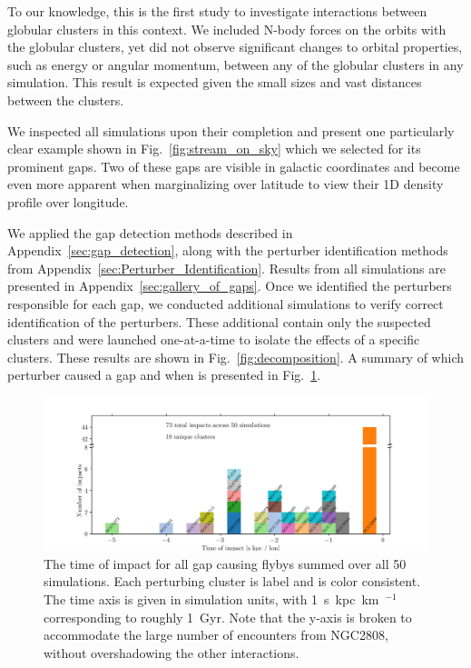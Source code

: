 \documentclass{aa}
\begin{document}
    To our knowledge, this is the first study to investigate interactions between globular clusters in this context. We included N-body forces on the orbits with the globular clusters, yet did not observe significant changes to orbital properties, such as energy or angular momentum, between any of the globular clusters in any simulation. This result is expected given the small sizes and vast distances between the clusters.

    We inspected all simulations upon their completion and present one particularly clear example shown in Fig.~\ref{fig:stream_on_sky} which we selected for its prominent gaps. Two of these gaps are visible in galactic coordinates and become even more apparent when marginalizing over latitude to view their 1D density profile over longitude.
    

    We applied the gap detection methods described in Appendix~\ref{sec:gap_detection}, along with the perturber identification methods from Appendix~\ref{sec:Perturber_Identification}. Results from all simulations are presented in Appendix~\ref{sec:gallery_of_gaps}. Once we identified the perturbers responsible for each gap, we conducted additional simulations to verify correct identification of the perturbers. These additional contain only the suspected clusters and were launched one-at-a-time to isolate the effects of a specific clusters. These results are shown in Fig.~\ref{fig:decomposition}. A summary of which perturber caused a gap and when is presented in Fig.~\ref{fig:histogram_impact_time}. 

    \begin{figure}
      \centering
      \includegraphics[width=\linewidth]{histogram_impact_time.png}
      \caption{The time of impact for all gap causing flybys summed over all 50 simulations. Each perturbing cluster is label and is color consistent. The time axis is given in simulation units, with 1~s~kpc~km~$^{-1}$ corresponding to roughly 1~Gyr. Note that the y-axis is broken to accommodate the large number of encounters from NGC2808, without overshadowing the other interactions.}
      \label{fig:histogram_impact_time}
      \end{figure}
\end{document}
